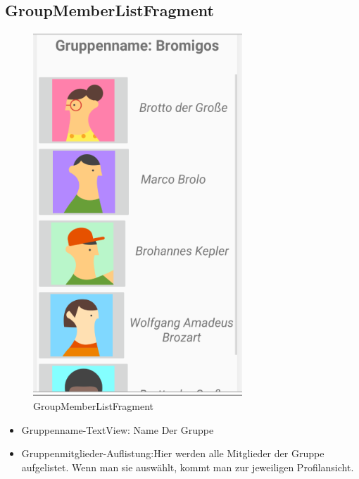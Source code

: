 \subsection{GroupMemberListFragment}
\begin{figure}[H]
	\centering
	
	\includegraphics[width=0.7\textwidth]{pics/groupMemberListFragment.png}%
	\caption{GroupMemberListFragment}%
	\label{view}%
\end{figure}


\begin{itemize}[nosep]
	\item Gruppenname-TextView: Name Der Gruppe 
	\item Gruppenmitglieder-Auflistung:Hier werden alle Mitglieder der Gruppe aufgelistet. Wenn man sie auswählt, kommt man zur jeweiligen Profilansicht.
\end{itemize}



